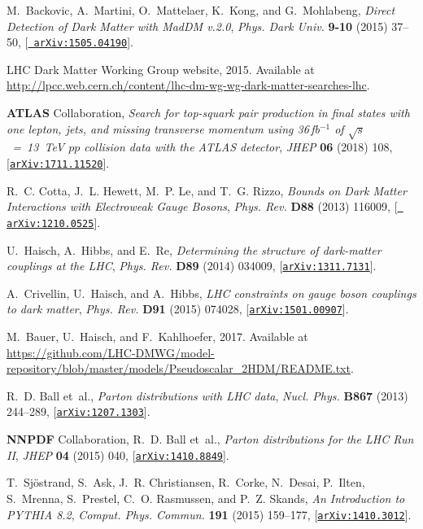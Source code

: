 \documentclass[a4paper, 11pt,notoc]{article}
\begin{document}
\begin{thebibliography}{100}
M.~Backovic, A.~Martini, O.~Mattelaer, K.~Kong, and G.~Mohlabeng, {\it {Direct
  Detection of Dark Matter with MadDM v.2.0}},  {\em Phys. Dark Univ.} {\bf
  9-10} (2015) 37--50, [\href{http://arxiv.org/abs/1505.04190}{{\tt
  arXiv:1505.04190}}].

LHC Dark Matter Working Group website, 2015.
\newblock Available at
  \url{http://lpcc.web.cern.ch/content/lhc-dm-wg-wg-dark-matter-searches-lhc}.

{\bf ATLAS} Collaboration, {\it {Search for top-squark pair
  production in final states with one lepton, jets, and missing transverse
  momentum using 36$\,$fb$^{-1}$ of $ \sqrt{s}$~=~13~TeV $pp$ collision data with the
  ATLAS detector}},  {\em JHEP} {\bf 06} (2018) 108,
  [\href{http://arxiv.org/abs/1711.11520}{{\tt arXiv:1711.11520}}].

R.~C. Cotta, J.~L. Hewett, M.~P. Le, and T.~G. Rizzo, {\it {Bounds on Dark
  Matter Interactions with Electroweak Gauge Bosons}},  {\em Phys. Rev.} {\bf
  D88} (2013) 116009, [\href{http://arxiv.org/abs/1210.0525}{{\tt
  arXiv:1210.0525}}].

U.~Haisch, A.~Hibbs, and E.~Re, {\it {Determining the structure of dark-matter
  couplings at the LHC}},  {\em Phys. Rev.} {\bf D89} (2014) 034009,
  [\href{http://arxiv.org/abs/1311.7131}{{\tt arXiv:1311.7131}}].

A.~Crivellin, U.~Haisch, and A.~Hibbs, {\it {LHC constraints on gauge boson
  couplings to dark matter}},  {\em Phys. Rev.} {\bf D91} (2015) 074028,
  [\href{http://arxiv.org/abs/1501.00907}{{\tt arXiv:1501.00907}}].

M.~Bauer, U.~Haisch, and F.~Kahlhoefer, 2017.
\newblock Available at
  \url{https://github.com/LHC-DMWG/model-repository/blob/master/models/Pseudoscalar_2HDM/README.txt}.

R.~D. Ball et~al., {\it {Parton distributions with LHC data}},  {\em Nucl.
  Phys.} {\bf B867} (2013) 244--289,
  [\href{http://arxiv.org/abs/1207.1303}{{\tt arXiv:1207.1303}}].

{\bf NNPDF} Collaboration, R.~D. Ball et~al., {\it {Parton distributions for
  the LHC Run II}},  {\em JHEP} {\bf 04} (2015) 040,
  [\href{http://arxiv.org/abs/1410.8849}{{\tt arXiv:1410.8849}}].

T.~Sj{\"o}strand, S.~Ask, J.~R. Christiansen, R.~Corke, N.~Desai, P.~Ilten,
  S.~Mrenna, S.~Prestel, C.~O. Rasmussen, and P.~Z. Skands, {\it {An
  Introduction to PYTHIA 8.2}},  {\em Comput. Phys. Commun.} {\bf 191} (2015)
  159--177, [\href{http://arxiv.org/abs/1410.3012}{{\tt arXiv:1410.3012}}].

\end{thebibliography}\endgroup
\end{document}
